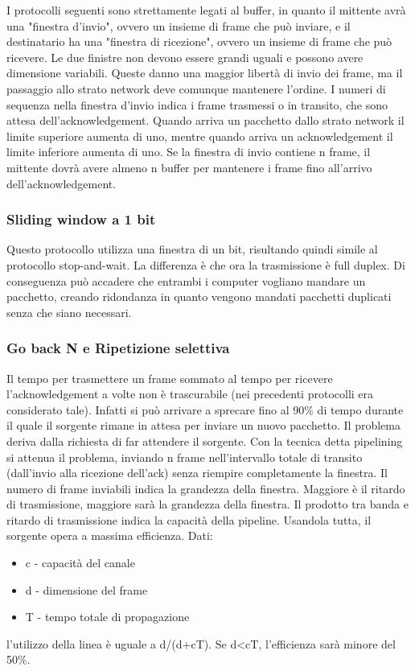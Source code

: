 I protocolli seguenti sono strettamente legati al buffer, in quanto il mittente avrà una "finestra d'invio", ovvero un insieme di frame che può inviare,
e il destinatario ha una "finestra di ricezione", ovvero un insieme di frame che può ricevere.
Le due finistre non devono essere grandi uguali e possono avere dimensione variabili.
Queste danno una maggior libertà di invio dei frame, ma il passaggio allo strato network deve comunque mantenere l'ordine.
I numeri di sequenza nella finestra d'invio indica i frame trasmessi o in transito, che sono attesa dell'acknowledgement.
Quando arriva un pacchetto dallo strato network il limite superiore aumenta di uno, mentre quando arriva un acknowledgement il limite inferiore aumenta di uno.
Se la finestra di invio contiene n frame, il mittente dovrà avere almeno n buffer per mantenere i frame fino all'arrivo dell'acknowledgement.

\subsubsection{Sliding window a 1 bit}
Questo protocollo utilizza una finestra di un bit, risultando quindi simile al protocollo stop-and-wait.
La differenza è che ora la trasmissione è full duplex.
Di conseguenza può accadere che entrambi i computer vogliano mandare un pacchetto,
creando ridondanza in quanto vengono mandati pacchetti duplicati senza che siano necessari.

\subsubsection{Go back N e Ripetizione selettiva}
Il tempo per trasmettere un frame sommato al tempo per ricevere l'acknowledgement a volte non è trascurabile (nei precedenti protocolli era considerato tale).
Infatti si può arrivare a sprecare fino al 90\% di tempo durante il quale il sorgente rimane in attesa per inviare un nuovo pacchetto.
Il problema deriva dalla richiesta di far attendere il sorgente.
Con la tecnica detta pipelining si attenua il problema, 
inviando n frame nell'intervallo totale di transito (dall'invio alla ricezione dell'ack) senza riempire completamente la finestra.
Il numero di frame inviabili indica la grandezza della finestra.
Maggiore è il ritardo di trasmissione, maggiore sarà la grandezza della finestra.
Il prodotto tra banda e ritardo di trasmissione indica la capacità della pipeline.
Usandola tutta, il sorgente opera a massima efficienza.
Dati: 
\begin{itemize}
    \item c - capacità del canale
    \item d - dimensione del frame
    \item T - tempo totale di propagazione
\end{itemize}
l'utilizzo della linea è uguale a d/(d+cT).
Se d<cT, l'efficienza sarà minore del 50\%.

